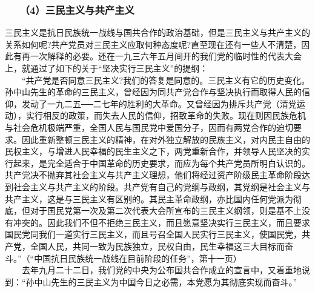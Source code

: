 \documentclass[cn,11pt,chinese]{elegantbook}
\def\myformat#1{\hfil\hfil #1}
\begin{document}
\subsubsection*{\myformat{　　（4）三民主义与共产主义}}
三民主义是抗日民族统一战线与国共合作的政治基础，但是三民主义与共产主义的关系如何呢?共产党员对三民主义应取何种态度呢?直至现在还有一些人不清楚，因此有再一次解释的必要。还在一九三六年五月间开的我们党的临时性的代表大会上，就通过了如下的关于“坚决实行三民主义”的提纲：\\
　　“共产党是否同意三民主义?我们的答复是同意的。三民主义有它的历史变化。孙中山先生的革命的三民主义，曾经因为同共产党合作与坚决执行而取得人民的信仰，发动了一九二五──二七年的胜利的大革命。又曾经因为排斥共产党（清党运动），实行相反的政策，而失去人民的信仰，招致革命的失败。现在则因民族危机与社会危机极端严重，全国人民与国民党中爱国分子，因而有两党合作的迫切要求。因此重新整顿三民主义的精神，在对外独立解放的民族主义，对内民主自由的民权主义，与增进人民幸福的民生主义之下，两党重新合作，并领导人民坚决的实行起来，是完全适合于中国革命的历史要求，而应为每个共产党员所明白认识的。共产党决不抛弃其社会主义与共产主义理想，他们将经过资产阶级民主革命阶段达到社会主义与共产主义的阶段。共产党有自己的党纲与政纲，其党纲是社会主义与共产主义，这是与三民主义有区别的。其民主革命政纲，亦比国内任何党派为彻底，但对于国民党第一次及第二次代表大会所宣布的三民主义纲领，则是基不上没有冲突的。因此我们不但不拒绝三民主义，而且愿意坚决实行三民主义，而且要求国民党同我们一道实行三民主义，而且号召全国人民实行三民主义，使国民党，共产党，全国人民，共同一致为民族独立，民权自由，民生幸福这三大目标而奋斗。”（“中国抗日民族统一战线在目前阶段的任务”，第十一页）\\
　　去年九月二十二日，我们党的中央为公布国共合作成立的宣言中，又着重地说到：“孙中山先生的三民主义为中国今日之必需，本党愿为其彻底实现而奋斗。”\\
\end{document}
